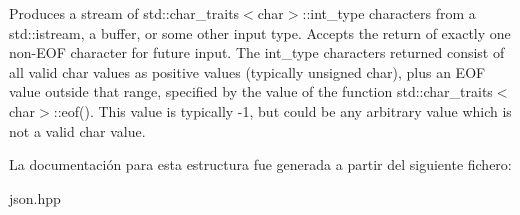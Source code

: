 Produces a stream of std\+::char\+\_\+traits$<$char$>$\+::int\+\_\+type characters from a std\+::istream, a buffer, or some other input type. Accepts the return of exactly one non-\/\+E\+OF character for future input. The int\+\_\+type characters returned consist of all valid char values as positive values (typically unsigned char), plus an E\+OF value outside that range, specified by the value of the function std\+::char\+\_\+traits$<$char$>$\+::eof(). This value is typically -\/1, but could be any arbitrary value which is not a valid char value. 

La documentación para esta estructura fue generada a partir del siguiente fichero\+:\begin{DoxyCompactItemize}
\item 
json.\+hpp\end{DoxyCompactItemize}
